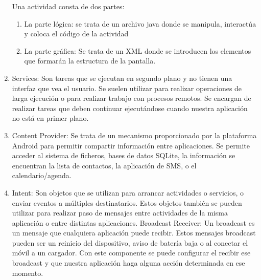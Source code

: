 \begin{enumerate}
Una actividad consta de dos partes:
\begin{enumerate}
\item	La parte lógica: se trata de un archivo java donde se manipula,
 interactúa y coloca el código de la actividad
\item	La parte gráfica: Se trata de un XML donde se introducen los
 elementos que formarán la estructura de la pantalla.
\end{enumerate}
\item	Services: Son tareas que se ejecutan en segundo plano y no
 tienen una interfaz que vea el usuario. Se suelen utilizar para realizar 
operaciones de larga ejecución o para realizar trabajo con procesos remotos.
Se encargan de realizar tareas que deben continuar ejecutándose 
cuando nuestra aplicación no está en primer plano.
\item	Content Provider: Se trata de un mecanismo proporcionado
 por la plataforma Android para permitir compartir información entre 
aplicaciones. Se permite acceder al sistema de ficheros, bases de 
datos SQLite, la información se encuentran la lista de contactos, la 
aplicación de SMS, o el calendario/agenda.  
\item	Intent: Son objetos que se utilizan para arrancar actividades o 
servicios, o enviar eventos a múltiples destinatarios. Estos objetos 
también se pueden utilizar para realizar paso de mensajes entre 
actividades de la misma aplicación o entre distintas aplicaciones.
Broadcast Receiver: Un broadcast es un mensaje que cualquiera 
aplicación puede recibir. Estos mensajes broadcast pueden ser 
un reinicio del dispositivo, aviso de batería baja o al conectar el
 móvil a un cargador. Con este componente se puede configurar
 el recibir ese broadcast y que nuestra aplicación haga alguna acción 
determinada en ese momento.
\end{enumerate}
